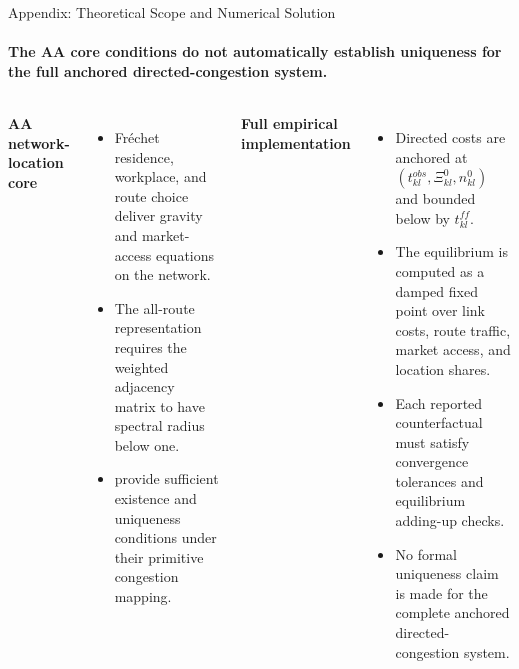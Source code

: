 \documentclass[11pt,aspectratio=169]{beamer}
\newcommand{\navback}[1]{\par\vspace{0.35em}\noindent\hfill\hyperlink{#1}{\beamerreturnbutton{back}}}
\begin{document}
\begin{frame}[label=appexist]{Appendix: Theoretical Scope and Numerical Solution}
\framesubtitle{The AA core conditions do not automatically establish uniqueness for the full anchored directed-congestion system.}
\begin{columns}[T,onlytextwidth]
\small\textbf{AA network-location core}\par
\vspace{0.25em}
\begin{itemize}\footnotesize\setlength\itemsep{0.45em}
  \item Fr\'echet residence, workplace, and route choice deliver gravity and market-access equations on the network.
  \item The all-route representation requires the weighted adjacency matrix to have spectral radius below one.
  \item \citet[Proposition~1]{allenarkolakis2022} provide sufficient existence and uniqueness conditions under their primitive congestion mapping.
\end{itemize}
\small\textbf{Full empirical implementation}\par
\vspace{0.25em}
\begin{itemize}\footnotesize\setlength\itemsep{0.45em}
  \item Directed costs are anchored at $(t_{kl}^{obs},\Xi_{kl}^{0},n_{kl}^{0})$ and bounded below by $t_{kl}^{ff}$.
  \item The equilibrium is computed as a damped fixed point over link costs, route traffic, market access, and location shares.
  \item Each reported counterfactual must satisfy convergence tolerances and equilibrium adding-up checks.
  \item No formal uniqueness claim is made for the complete anchored directed-congestion system.
\end{itemize}
\end{columns}
\navback{equilibrium}
\end{frame}

\end{document}
